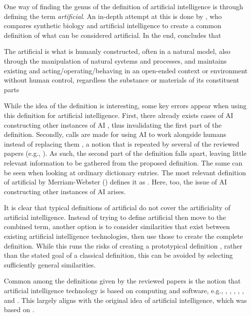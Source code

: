 One way of finding the genus of the definition of artificial intelligence is through defining the term \textit{artificial}. An in-depth attempt at this is done by \parencite{Bianchini_2021}, who compares synthetic biology and artificial intelligence to create a common definition of what can be considered artificial. In the end, \citeauthor{Bianchini_2021} concludes that
\begin{displayquote}
    The artificial is what is humanly constructed, often in a natural model, also through the manipulation of natural systems and processes, and maintains existing and acting/operating/behaving in an open-ended context or environment without human control, regardless the substance or materials of its constituent parts
\end{displayquote}
While the idea of the definition is interesting, some key errors appear when using this definition for artificial intelligence. First, there already exists cases of AI constructing other instances of AI \parencite{AI_making_AI}, thus invalidating the first part of the definition. Secondly, calls are made for using AI to work alongside humans instead of replacing them \parencite{AI_alongside}, a notion that is repeated by several of the reviewed papers (e.g., \cite{Vetro_2019,WangY_2020,Doorn_2021,Brand_2022,Havrda_2020}). As such, the second part of the definition falls apart, leaving little relevant information to be gathered from the proposed definition. The same can be seen when looking at ordinary dictionary entries. The most relevant definition of artificial by Merriam-Webster (\cite{dictionary_artificial}) defines it as . Here, too, the issue of AI constructing other instances of AI arises.

It is clear that typical definitions of artificial do not cover the artificiality of artificial intelligence. Instead of trying to define artificial then move to the combined term, another option is to consider similarities that exist between existing artificial intelligence technologies, then use those to create the complete definition. While this runs the risks of creating a prototypical definition \parencite[p. 36]{Seppälä_2014}, rather than the stated goal of a classical definition, this can be avoided by selecting sufficiently general similarities.

Common among the definitions given by the reviewed papers is the notion that artificial intelligence technology is based on computing and software, e.g.,  \parencite[p. 1]{Siala_2022},  \parencite[p. 130]{Brand_2022},  \parencite[p. 2]{Dignum_2021},  \parencite[p. 1]{Havrda_2020},  \parencite[p. 3]{Liu_2021}, and  \parencite[p. 1]{Lukkien_2021}. This largely aligns with the original idea of artificial intelligence, which was based on  \parencite[p. 87]{Moor_2006}.

